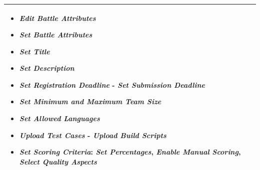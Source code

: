 \begin{enumerate}
\begin{center}
\begin{tabular}{ | m{10em} | m{10cm}| }
      \begin{itemize}
          \item \textit{Edit Battle Attributes}
          \item \textit{Set Battle Attributes}
          \item \textit{Set Title}
          \item \textit{Set Description}
          \item \textit{Set Registration Deadline} - \textit{Set Submission Deadline}
          \item \textit{Set Minimum and Maximum Team Size}
          \item \textit{Set Allowed Languages}
          \item \textit{Upload Test Cases} - \textit{Upload Build Scripts}
          \item \textit{Set Scoring Criteria}: \textit{Set Percentages}, \textit{Enable Manual Scoring}, \textit{Select Quality Aspects}
      \end{itemize}
          \\ 
      \hline
    \end{tabular}
\end{center} 

\end{enumerate}
\newpage
